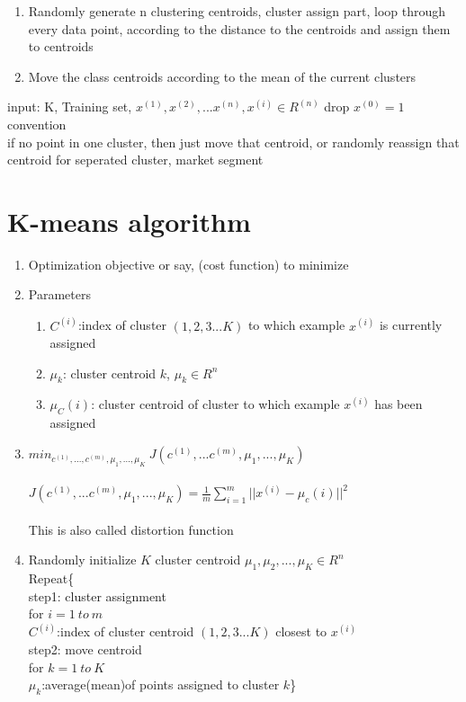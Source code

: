 \documentclass[10pt]{article}
\begin{document}
  \begin{enumerate}
    \item Randomly generate n clustering centroids, cluster assign part, loop through every data point, according to the distance to the centroids and assign them to centroids
    \item Move the class centroids according to the mean of the current clusters
  \end{enumerate}

  input: K, Training set, ${x^{(1)},x^{(2)},...x^{(n)}, x^{(i)}\in R^{(n)}}$ drop $x^(0)=1$ convention \\
  if no point in one cluster, then just move that centroid, or randomly reassign that centroid
  for seperated cluster, market segment

\section{K-means algorithm}
  \begin{enumerate}
    \item Optimization objective or say, (cost function) to minimize\\
    \item Parameters
    \begin{enumerate}
      \item $C^{(i)}$:index of cluster $(1,2,3...K)$ to which example $x^{(i)}$ is currently assigned\\
      \item $\mu_k$: cluster centroid $k$, $\mu_k \in R^n$\\
      \item $\mu_C(i)$: cluster centroid of cluster to which example $x^{(i)}$ has been assigned\\
    \end{enumerate}

    \item $min_{c^{(1)},...,c^{(m)},\mu_1,...,\mu_K} \ J(c^{(1)},...c^{(m)},\mu_1,...,\mu_K)$\\
          \\
          $J(c^{(1)},...c^{(m)},\mu_1,...,\mu_K) = \frac{1}{m} \sum_{i = 1}^{m}||x^{(i)}-\mu_c(i)||^2$\\
          \\
          This is also called distortion function\\
    \item Randomly initialize $K$ cluster centroid $\mu_1,\mu_2,...,\mu_K \in R^n$\\
          Repeat\{\\
                  step1: cluster assignment\\
                  for $i=1 \ to \ m$\\
                  $C^{(i)}$:index of cluster centroid $(1,2,3...K)$  closest to $x^{(i)}$\\ 
                  step2: move centroid\\
                  for $k=1 \ to \ K$\\
                  $\mu_k$:average(mean)of points assigned to cluster $k$\}
  \end{enumerate}
\end{document}
